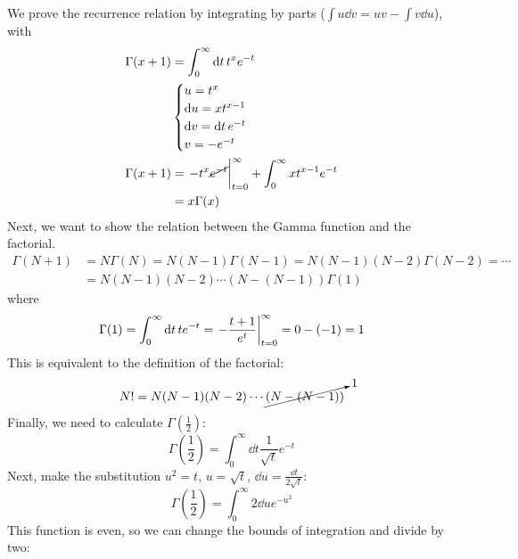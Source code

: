 \documentclass[a4paper,twoside]{article}
\begin{document}
\begin{problem}
    We prove the recurrence relation by integrating by parts ($ \int u \dd{v} = uv - \int v \dd{u} $), with
        \begin{align}
            \Gamma(x + 1) &= \int_{0}^{\infty} \dd{t} t^{x} e^{-t} \\
            &\begin{cases} u = t^{x} \\ \dd{u} = x t^{x-1} \\ \dd{v} = \dd{t} e^{-t} \\ v = - e^{-t}\end{cases} \\
            \Gamma(x + 1) &= \eval{-t^{x} \cancel{e^{-t}}}_{t=0}^{\infty} + \int_{0}^{\infty} x t^{x-1} e^{-t} \\
            &= x \Gamma(x)
        \end{align}
        Next, we want to show the relation between the Gamma function and the factorial.
        \begin{align}
            \Gamma(N + 1) &= N \Gamma(N) = N (N - 1) \Gamma(N - 1) = N (N - 1)(N - 2) \Gamma(N-2) = \cdots \\
            &= N (N - 1)(N - 2)\cdots(N-(N-1)) \Gamma(1)
        \end{align}
        where
        \begin{equation}
            \Gamma(1) = \int_{0}^{\infty} \dd{t} t e^{-t} = \eval{- \frac{t + 1}{e^{t}}}_{t=0}^{\infty} = 0 - (-1) = 1
        \end{equation}
        This is equivalent to the definition of the factorial:
        \begin{equation}
            N! = N(N-1)(N-2)\cdots\cancelto{1}{(N-(N-1))}
        \end{equation}
        Finally, we need to calculate $ \Gamma\left( \frac{1}{2} \right) $:
        \begin{equation}
            \Gamma\left( \frac{1}{2} \right) = \int_{0}^{\infty} \dd{t} \frac{1}{\sqrt{t}} e^{-t} 
        \end{equation}
        Next, make the substitution $ u^2 = t $, $ u = \sqrt{t} $, $ \dd{u} = \frac{\dd{t}}{2 \sqrt{t}} $:
        \begin{equation}
            \Gamma\left( \frac{1}{2} \right) = \int_{0}^{\infty} 2\dd{u} e^{- u^2}
        \end{equation}
        This function is even, so we can change the bounds of integration and divide by two:
        \begin{equation}

\end{equation}
\end{problem}
\end{document}
